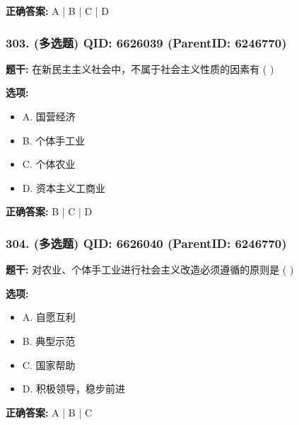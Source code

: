 \documentclass[12pt,UTF8]{ctexart}
\begin{document}
\textbf{正确答案:}
A | B | C | D

\vspace{0.3em}\hrulefill\vspace{0.7em}

\subsubsection*{303. (多选题) \small QID: 6626039 (ParentID: 6246770)}

\textbf{题干:}
在新民主主义社会中，不属于社会主义性质的因素有  ( )



\textbf{选项:}
\begin{itemize}[leftmargin=*]

  \item A. 国营经济

  \item B. 个体手工业

  \item C. 个体农业

  \item D. 资本主义工商业

\end{itemize}

\textbf{正确答案:}
B | C | D

\vspace{0.3em}\hrulefill\vspace{0.7em}

\subsubsection*{304. (多选题) \small QID: 6626040 (ParentID: 6246770)}

\textbf{题干:}
对农业、个体手工业进行社会主义改造必须遵循的原则是  ( )



\textbf{选项:}
\begin{itemize}[leftmargin=*]

  \item A. 自愿互利

  \item B. 典型示范

  \item C. 国家帮助

  \item D. 积极领导，稳步前进

\end{itemize}

\textbf{正确答案:}
A | B | C
\end{document}
